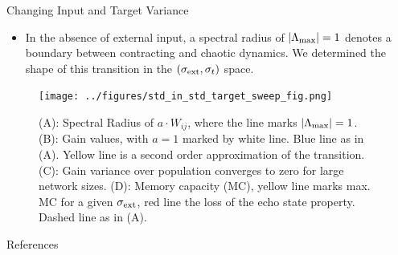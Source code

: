 \documentclass{beamer}
\begin{document}
\begin{frame}[t]
\begin{columns}[t]
\begin{column}{.55\textwidth}
\begin{myblock}{Changing Input and Target Variance}
\begin{itemize}
	\item In the absence of external input, a spectral radius of $|\Lambda_{\rm max}| = 1$ denotes a boundary between contracting and chaotic dynamics. We determined the shape of this transition in the $\left(\sigma_{\rm ext},\sigma_t\right)$ space.
\end{itemize}
	\begin{figure}
		\texttt{[image: ../figures/std\_in\_std\_target\_sweep\_fig.png]}
		\caption{(A): Spectral Radius of $a\cdot W_{ij}$, where the line marks $|\Lambda_{\rm max}| = 1$. (B): Gain values, with $a=1$ marked by white line. Blue line as in (A). Yellow line is a second order approximation of the transition. (C): Gain variance over population converges to zero for large network sizes. (D): Memory capacity (MC), yellow line marks max. MC for a given $\sigma_{\rm ext}$, red line the loss of the echo state property. Dashed line as in (A).}
		\label{fig:sweep_sim}
	\end{figure}
\end{myblock}


\begin{myblock}{References}
	\scriptsize
	
\end{myblock}

\end{column}
\end{columns}
\end{frame}
\end{document}
